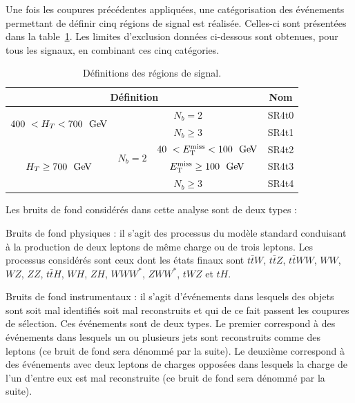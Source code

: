 Une fois les coupures pr\'ec\'edentes appliqu\'ees, une cat\'egorisation des \'ev\'enements permettant de d\'efinir cinq r\'egions de signal est r\'ealis\'ee. Celles-ci sont pr\'esent\'ees dans la table~\ref{tab:allSR}. Les limites d'exclusion donn\'ees ci-dessous sont obtenues, pour tous les signaux, en combinant ces cinq cat\'egories.

\begin{table}[!htb]
	\begin{center}
	\begin{tabular}{ c | c | c | c }
	\hline
	\multicolumn{3}{c|}{D\'efinition} & Nom \\
        \hline
	\multirow{2}{*}{$400~< H_T < 700~\GeV{}$}		& \multicolumn{2}{c|}{$N_b = 2$} &  SR4t0 \\
	\cline{2-4}
	 				& \multicolumn{2}{c|}{$N_b \geq 3$} &SR4t1 \\
	\hline
	\multirow{3}{*}{$H_T \geq 700~\GeV$} 			& \multirow{2}{*}{$N_b = 2$}  				& $40~< \hbox{\met} < 100~\GeV$ 		&  SR4t2 \\
	\cline{3-4}
											 &					 				& $\hbox{\met}\geq 100~\GeV$					&  SR4t3 \\
	\cline{2-4}
											&  \multicolumn{2}{c|}{$N_b \geq 3$} & SR4t4 \\
	\hline
\end{tabular}
\caption{D\'efinitions des r\'egions de signal.\label{tab:allSR}}
\end{center}
\end{table} 

Les bruits de fond consid\'er\'es dans cette analyse sont de deux types :
\begin{maliste}
\item Bruits de fond physiques : il s'agit des processus du mod\`ele standard conduisant \`a la production de deux leptons de m\^eme charge ou de trois leptons. Les processus consid\'er\'es sont ceux dont les \'etats finaux sont $t\bar{t}W$, $t\bar{t}Z$, $t\bar{t}WW$, $WW$, $WZ$, $ZZ$, $t\bar{t}H$, $WH$, $ZH$, $WWW^*$, $ZWW^*$, $tWZ$ et $tH$.
\item Bruits de fond instrumentaux : il s'agit d'\'ev\'enements dans lesquels des objets sont soit mal identifi\'es soit mal reconstruits et qui de ce fait passent les coupures de s\'election. Ces \'ev\'enements sont de deux types. Le premier correspond \`a des \'ev\'enements dans lesquels un ou plusieurs jets sont reconstruits comme des leptons (ce bruit de fond sera d\'enomm\'e  par la suite). Le deuxi\`eme correspond \`a des \'ev\'enements avec deux leptons de charges oppos\'ees dans lesquels la charge de l'un d'entre eux est mal reconstruite (ce bruit de fond sera d\'enomm\'e  par la suite).
\end{maliste}


